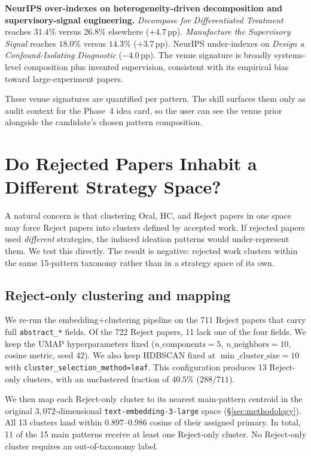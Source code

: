 \documentclass[10pt,a4paper]{article}
\begin{document}
\textbf{NeurIPS over-indexes on heterogeneity-driven decomposition and supervisory-signal engineering.} \emph{Decompose for Differentiated Treatment} reaches $31.4\%$ versus $26.8\%$ elsewhere ($+4.7$\,pp). \emph{Manufacture the Supervisory Signal} reaches $18.0\%$ versus $14.3\%$ ($+3.7$\,pp). NeurIPS under-indexes on \emph{Design a Confound-Isolating Diagnostic} ($-4.0$\,pp). The venue signature is broadly systems-level composition plus invented supervision, consistent with its empirical bias toward large-experiment papers.

These venue signatures are quantified per pattern. The skill surfaces them only as audit context for the Phase~4 idea card, so the user can see the venue prior alongside the candidate's chosen pattern composition.

\section{Do Rejected Papers Inhabit a Different Strategy Space?}
\label{sec:reject}

A natural concern is that clustering Oral, HC, and Reject papers in one space may force Reject papers into clusters defined by accepted work. If rejected papers used \emph{different} strategies, the induced ideation patterns would under-represent them. We test this directly. The result is negative: rejected work clusters within the same 15-pattern taxonomy rather than in a strategy space of its own.

\subsection{Reject-only clustering and mapping}

We re-run the embedding+clustering pipeline on the 711 Reject papers that carry full \texttt{abstract\_*} fields. Of the 722 Reject papers, 11 lack one of the four fields. We keep the UMAP hyperparameters fixed ($n\_\text{components}{=}5$, $n\_\text{neighbors}{=}10$, cosine metric, seed 42). We also keep HDBSCAN fixed at $\min\_\text{cluster\_size}{=}10$ with \texttt{cluster\_selection\_method=leaf}. This configuration produces 13 Reject-only clusters, with an unclustered fraction of $40.5\%$ ($288 / 711$).

We then map each Reject-only cluster to its nearest main-pattern centroid in the original $3{,}072$-dimensional \texttt{text-embedding-3-large} space (\S\ref{sec:methodology}). All 13 clusters land within $0.897$--$0.986$ cosine of their assigned primary. In total, 11 of the 15 main patterns receive at least one Reject-only cluster. No Reject-only cluster requires an out-of-taxonomy label.
\end{document}
